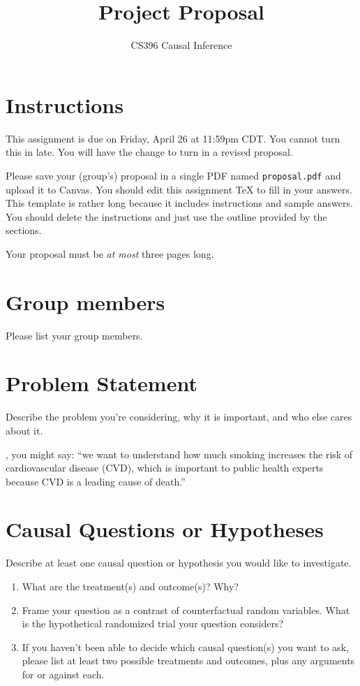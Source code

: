 \documentclass[12pt]{article}
\title{Project Proposal \vspace{-1em}}
\author{CS396 Causal Inference}
\begin{document}
\maketitle

\section*{Instructions}

This assignment is due on Friday, April 26 at 11:59pm CDT. You cannot turn this
in late. You will have the change to turn in a revised proposal.

Please save your (group's) proposal in a single PDF named {\tt proposal.pdf}
and upload it to Canvas.
You should edit this assignment TeX to fill in your answers. This template is rather long because it includes instructions and sample answers. You should delete the instructions and just use the outline provided by the sections.

Your proposal must be \emph{at most} three pages long.

\section{Group members}

\noindent Please list your group members.

\section{Problem Statement}

\noindent Describe the problem you're considering, why it is important, and who else cares about it.

, you might say: ``we want to understand how much smoking increases the risk of cardiovascular disease (CVD), which is important to public health experts because CVD is a leading cause of death.''

\section{Causal Questions or Hypotheses}

\noindent Describe at least one causal question or hypothesis you would like to investigate. 
\begin{enumerate}[itemsep=0em,label={(\alph*)}]
\item What are the treatment(s) and outcome(s)? Why?
\item Frame your question as a contrast of counterfactual random variables.
  What is the hypothetical randomized trial your question considers?
\item If you haven't been able to decide which causal question(s) you want to
  ask, please list at least two possible treatments and outcomes, plus any
  arguments for or against each.
\end{enumerate}
\end{document}
